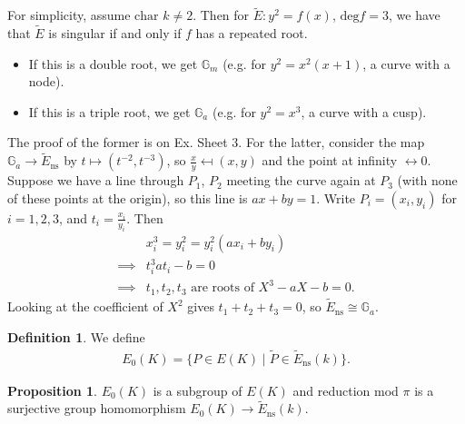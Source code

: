 \documentclass{article}
\theoremstyle{definition}
\newtheorem{prop}[theorem]{Proposition}
\newtheorem{defn}{Definition}[section]
\begin{document}
For simplicity, assume $\text{char }k \neq 2$. Then for $\widetilde{E} : y^2=f(x)$, $\text{deg}f=3$, we have that $\widetilde{E}$ is singular if and only if $f$ has a repeated root.
\begin{itemize}
    \item If this is a double root, we get $\mathbb{G}_m$ (e.g. for $y^2=x^2(x+1)$, a curve with a node).
    \item If this is a triple root, we get $\mathbb{G}_a$ (e.g. for $y^2=x^3$, a curve with a cusp).
\end{itemize}
The proof of the former is on Ex. Sheet 3. For the latter, consider the map $\mathbb{G}_a \to \widetilde{E}_{\text{ns}}$ by $t \mapsto (t^{-2},t^{-3})$, so $\frac{x}{y}\mapsfrom (x,y)$ and the point at infinity $\leftrightarrow 0$. Suppose we have a line through $P_1$, $P_2$ meeting the curve again at $P_3$ (with none of these points at the origin), so this line is $ax+by=1$. Write $P_i = (x_i,y_i)$ for $i =1,2,3$, and $t_i = \frac{x_i}{y_i}$. Then 
\begin{align*}
    &x_i^3=y_i^2=y_i^2(ax_i+by_i)\\
    \implies & t_i^3at_i-b=0\\
    \implies & t_1,t_2,t_3 \text{ are roots of }X^3-aX-b=0.
\end{align*}
Looking at the coefficient of $X^2$ gives $t_1+t_2+t_3=0$, so $\widetilde{E}_{\text{ns}} \cong \mathbb{G}_a$.
\begin{defn}
    We define
    \begin{align*}
        E_0(K) = \{P \in E(K) \mid \widetilde{P} \in \widetilde{E}_{\text{ns}}(k)\}.
    \end{align*}
\end{defn}
\begin{prop}\label{prop9.5}
    $E_0(K)$ is a subgroup of $E(K)$ and reduction mod $\pi$ is a surjective group homomorphism $E_0(K) \to \widetilde{E}_{\text{ns}}(k)$.
\end{prop}
\end{document}
